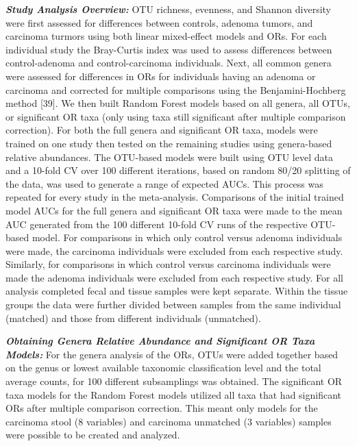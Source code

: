 \documentclass[12pt,]{article}
\begin{document}
\textbf{\emph{Study Analysis Overview:}} OTU richness, evenness, and
Shannon diversity were first assessed for differences between controls,
adenoma tumors, and carcinoma turmors using both linear mixed-effect
models and ORs. For each individual study the Bray-Curtis index was used
to assess differences between control-adenoma and control-carcinoma
individuals. Next, all common genera were assessed for differences in
ORs for individuals having an adenoma or carcinoma and corrected for
multiple comparisons using the Benjamini-Hochberg method {[}39{]}. We
then built Random Forest models based on all genera, all OTUs, or
significant OR taxa (only using taxa still significant after multiple
comparison correction). For both the full genera and significant OR
taxa, models were trained on one study then tested on the remaining
studies using genera-based relative abundances. The OTU-based models
were built using OTU level data and a 10-fold CV over 100 different
iterations, based on random 80/20 splitting of the data, was used to
generate a range of expected AUCs. This process was repeated for every
study in the meta-analysis. Comparisons of the initial trained model
AUCs for the full genera and significant OR taxa were made to the mean
AUC generated from the 100 different 10-fold CV runs of the respective
OTU-based model. For comparisons in which only control versus adenoma
individuals were made, the carcinoma individuals were excluded from each
respective study. Similarly, for comparisons in which control versus
carcinoma individuals were made the adenoma individuals were excluded
from each respective study. For all analysis completed fecal and tissue
samples were kept separate. Within the tissue groups the data were
further divided between samples from the same individual (matched) and
those from different individuals (unmatched).

\textbf{\emph{Obtaining Genera Relative Abundance and Significant OR
Taxa Models:}} For the genera analysis of the ORs, OTUs were added
together based on the genus or lowest available taxonomic classification
level and the total average counts, for 100 different subsamplings was
obtained. The significant OR taxa models for the Random Forest models
utilized all taxa that had significant ORs after multiple comparison
correction. This meant only models for the carcinoma stool (8 variables)
and carcinoma unmatched (3 variables) samples were possible to be
created and analyzed.
\end{document}
